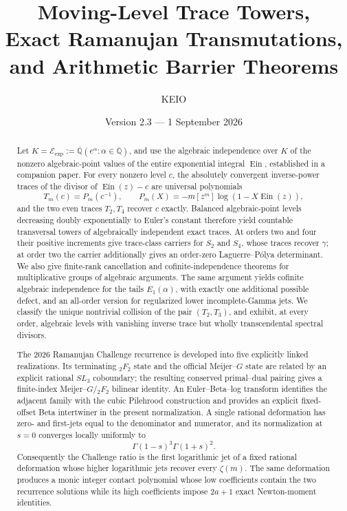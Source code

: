 \documentclass[11pt]{article}
\title{\bfseries Moving-Level Trace Towers,\\
Exact Ramanujan Transmutations,\\
and Arithmetic Barrier Theorems}
\author{KEIO}
\date{Version 2.3 --- 1 September 2026}
\theoremstyle{definition}
\theoremstyle{remark}
\newcommand{\Qbar}{\overline{\mathbb Q}}
\newcommand{\Ein}{\operatorname{Ein}}
\newcommand{\Eexp}{\mathcal E_{\mathrm{exp}}}
\begin{document}
\maketitle

\begin{abstract}
Let \(K=\Eexp:=\Qbar(e^\alpha:\alpha\in\Qbar)\), and use the algebraic
independence over \(K\) of the nonzero algebraic-point values of the entire
exponential integral \(\Ein\), established in a companion paper.  For every
nonzero level \(c\), the absolutely convergent inverse-power traces of the
divisor of \(\Ein(z)-c\) are universal polynomials
\[
 T_m(c)=P_m(c^{-1}),\qquad
 P_m(X)=-m[z^m]\log(1-X\Ein(z)),
\]
and the two even traces \(T_2,T_4\) recover \(c\) exactly.  Balanced
algebraic-point levels decreasing doubly exponentially to Euler's constant
therefore yield countable transversal towers of algebraically independent
exact traces.  At orders two and four their positive increments give
trace-class carriers for \(S_2\) and \(S_4\), whose traces recover
\(\gamma\); at order two the carrier additionally gives an order-zero
Laguerre--P\'olya determinant.  We also give finite-rank cancellation and
cofinite-independence theorems for multiplicative groups of algebraic
arguments.  The same argument yields cofinite algebraic independence for
the tails \(E_1(\alpha)\), with exactly one additional possible defect, and
an all-order version for regularized lower incomplete-Gamma jets.  We
classify the unique nontrivial collision of the pair
\((T_2,T_3)\), and exhibit, at every order, algebraic levels with vanishing
inverse trace but wholly transcendental spectral divisors.

The 2026 Ramanujan Challenge recurrence is developed into five explicitly
linked realizations.  Its terminating \({}_2F_2\) state and the official
Meijer--\(G\) state are related by an explicit rational \(SL_3\) coboundary;
the resulting conserved primal--dual pairing gives a finite-index
Meijer--\(G\)/\({}_2F_2\) bilinear identity.  An Euler--Beta--log transform
identifies the adjacent family with the cubic Pilehrood construction and
provides an explicit fixed-offset Beta intertwiner in the present
normalization.  A single rational deformation has
zero- and first-jets equal to the denominator and numerator, and its
normalization at \(s=0\) converges locally uniformly to
\[
 \Gamma(1-s)^3\Gamma(1+s)^2.
\]
Consequently the Challenge ratio is the first logarithmic jet of a fixed
rational deformation whose higher logarithmic jets recover every
\(\zeta(m)\).  The same
deformation produces a monic integer contact polynomial whose low
coefficients contain the two recurrence solutions while its high
coefficients impose \(2a+1\) exact Newton-moment identities.


\end{abstract}
\end{document}
